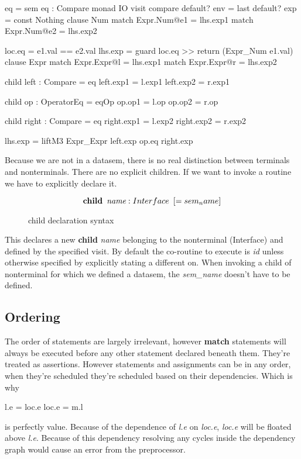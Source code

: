 \begin{code}
eq = sem eq : Compare monad IO
       visit compare
         default? env = last
         default? exp = const Nothing
         clause Num
           match Expr.Num@e1 = lhs.exp1
           match Expr.Num@e2 = lhs.exp2
           
           loc.eq  = e1.val == e2.val
           lhs.exp = guard loc.eq >> return (Expr_Num e1.val)
         clause Expr
           match Expr.Expr@l = lhs.exp1
           match Expr.Expr@r = lhs.exp2
           
           child left : Compare = eq
           left.exp1 = l.exp1
           left.exp2 = r.exp1
           
           child op : OperatorEq = eqOp
           op.op1 = l.op
           op.op2 = r.op
           
           child right : Compare = eq
           right.exp1 = l.exp2
           right.exp2 = r.exp2
           
           lhs.exp = liftM3 Expr_Expr left.exp op.eq right.exp
\end{code}

Because we are not in a datasem, there is no real distinction between terminals and nonterminals. There are no explicit children. If we want to invoke a routine we have to explicitly declare it.

\begin{figure}[h!]
\[
\textbf{child} \hspace{5pt} \emph{name} : Interface \hspace{5pt} [= sem_name]
\]
\caption{child declaration syntax}
\end{figure}

This declares a new \textbf{child} \emph{name} belonging to the nonterminal (Interface) and defined by the specified visit\cite{visitag}. By default the co-routine to execute is \emph{id} unless otherwise specified by explicitly stating a different on. When invoking a child of nonterminal for which we defined a datasem, the \emph{sem\_name} doesn't have to be defined.

\subsection{Ordering}
The order of statements are largely irrelevant, however \textbf{match} statements will always be executed before any other statement declared beneath them. They're treated as assertions. However statements and assignments can be in any order, when they're scheduled they're scheduled based on their dependencies. Which is why

\begin{code}
l.e = loc.e
loc.e = m.l
\end{code}

is perfectly value. Because of the dependence of \emph{l.e} on \emph{loc.e}, \emph{loc.e} will be floated above \emph{l.e}. Because of this dependency resolving any cycles inside the dependency graph would cause an error from the preprocessor.
